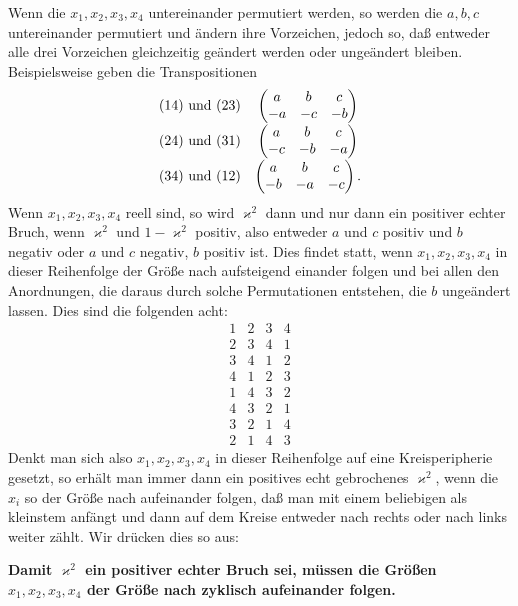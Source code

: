 \documentclass[11pt]{article}
\begin{document}
Wenn die $x_1,x_2,x_3,x_4$ untereinander permutiert werden, so werden die $a,b,c$ untereinander permutiert und ändern ihre Vorzeichen, jedoch so, daß entweder alle drei Vorzeichen gleichzeitig geändert werden oder ungeändert bleiben. Beispielsweise geben die Transpositionen
\[
\begin{array}{c@{\quad}c}
(14)\text{ und }(23)&\begin{pmatrix}a&b&c\\-a&-c&-b\end{pmatrix}\\[0.7em]
(24)\text{ und }(31)&\begin{pmatrix}a&b&c\\-c&-b&-a\end{pmatrix}\\[0.7em]
(34)\text{ und }(12)&\begin{pmatrix}a&b&c\\-b&-a&-c\end{pmatrix}.
\end{array}
\]
Wenn $x_1,x_2,x_3,x_4$ reell sind, so wird $\varkappa^2$ dann und nur dann ein positiver echter Bruch, wenn $\varkappa^2$ und $1-\varkappa^2$ positiv, also entweder $a$ und $c$ positiv und $b$ negativ oder $a$ und $c$ negativ, $b$ positiv ist. Dies findet statt, wenn $x_1,x_2,x_3,x_4$ in dieser Reihenfolge der Größe nach aufsteigend einander folgen und bei allen den Anordnungen, die daraus durch solche Permutationen entstehen, die $b$ ungeändert lassen. Dies sind die folgenden acht:
\[
\begin{array}{cccc}
1&2&3&4\\
2&3&4&1\\
3&4&1&2\\
4&1&2&3\\
1&4&3&2\\
4&3&2&1\\
3&2&1&4\\
2&1&4&3
\end{array}
\]
Denkt man sich also $x_1,x_2,x_3,x_4$ in dieser Reihenfolge auf eine Kreisperipherie gesetzt, so erhält man immer dann ein positives echt gebrochenes $\varkappa^2$, wenn die $x_i$ so der Größe nach aufeinander folgen, daß man mit einem beliebigen als kleinstem anfängt und dann auf dem Kreise entweder nach rechts oder nach links weiter zählt. Wir drücken dies so aus:

\begin{center}
\textbf{Damit $\varkappa^2$ ein positiver echter Bruch sei, müssen die Größen $x_1,x_2,x_3,x_4$ der Größe nach zyklisch aufeinander folgen.}
\end{center}
\end{document}
